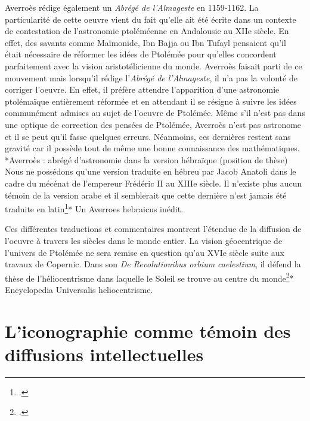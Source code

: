 \documentclass[a4paper,12pt,twoside]{book}
\begin{document}
	 Averroès rédige également un \textit{Abrégé de l'Almageste} en 1159-1162. La particularité de cette oeuvre vient du fait qu'elle ait été écrite dans un contexte de contestation de l'astronomie ptoléméenne en Andalousie au XIIe siècle. En effet, des savants comme Maïmonide, Ibn Bajja ou Ibn Tufayl pensaient qu'il était nécessaire de réformer les idées de Ptolémée pour qu'elles concordent parfaitement avec la vision aristotélicienne du monde. Averroès faisait parti de ce mouvement mais lorsqu'il rédige l'\textit{Abrégé de l'Almageste}, il n'a pas la volonté de corriger l'oeuvre. En effet, il préfère attendre l'apparition d'une astronomie ptolémaïque entièrement réformée et en attendant il se résigne à suivre les idées communément admises au sujet de l'oeuvre de Ptolémée. Même s'il n'est pas dans une optique de correction des pensées de Ptolémée, Averroès n'est pas astronome et il se peut qu'il fasse quelques erreurs. Néanmoins, ces dernières restent sans gravité car il possède tout de même une bonne connaissance des mathématiques. *Averroès : abrégé d'astronomie dans la version hébraïque (position de thèse) Nous ne possédons qu'une version traduite en hébreu par Jacob Anatoli dans le cadre du mécénat de l'empereur Frédéric II au XIIIe siècle. Il n'existe plus aucun témoin de la version arabe et il semblerait que cette dernière n'est jamais été traduite en latin\footcite{layAverroesHebraicusInedit2005}* Un Averroes hebraicus inédit.
	
	Ces différentes traductions et commentaires montrent l'étendue de la diffusion de l'oeuvre à travers les siècles dans le monde entier. La vision géocentrique de l'univers de Ptolémée ne sera remise en question qu'au XVIe siècle suite aux travaux de Copernic. Dans son \textit{De Revolutionibus orbium caelestium}, il défend la thèse de l'héliocentrisme dans laquelle le Soleil se trouve au centre du monde\footcite{verdetHELIOCENTRISME2008}* Encyclopedia Universalis heliocentrisme.
	
	
	
	
	\section{L'iconographie comme témoin des diffusions intellectuelles}
	
\end{document}
